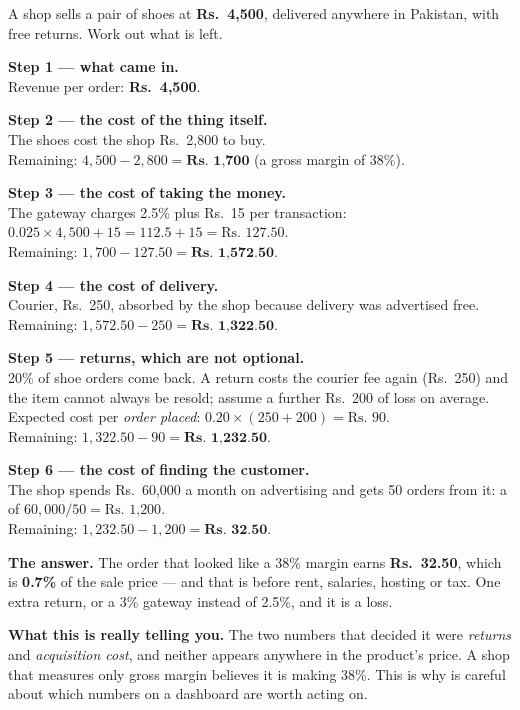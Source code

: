 \begin{worked}
A shop sells a pair of shoes at \textbf{Rs.~4{,}500}, delivered anywhere in
Pakistan, with free returns. Work out what is left.

\smallskip
\textbf{Step 1 --- what came in.}\\
Revenue per order: \textbf{Rs.~4{,}500}.

\smallskip
\textbf{Step 2 --- the cost of the thing itself.}\\
The shoes cost the shop Rs.~2{,}800 to buy.\\
Remaining: $4{,}500 - 2{,}800 = \textbf{Rs.~1{,}700}$ (a gross margin of 38\%).

\smallskip
\textbf{Step 3 --- the cost of taking the money.}\\
The gateway charges 2.5\% plus Rs.~15 per transaction:
$0.025 \times 4{,}500 + 15 = 112.5 + 15 = \text{Rs.~127.50}$.\\
Remaining: $1{,}700 - 127.50 = \textbf{Rs.~1{,}572.50}$.

\smallskip
\textbf{Step 4 --- the cost of delivery.}\\
Courier, Rs.~250, absorbed by the shop because delivery was advertised free.\\
Remaining: $1{,}572.50 - 250 = \textbf{Rs.~1{,}322.50}$.

\smallskip
\textbf{Step 5 --- returns, which are not optional.}\\
20\% of shoe orders come back. A return costs the courier fee again (Rs.~250)
and the item cannot always be resold; assume a further Rs.~200 of loss on
average. Expected cost per \emph{order placed}:
$0.20 \times (250 + 200) = \text{Rs.~90}$.\\
Remaining: $1{,}322.50 - 90 = \textbf{Rs.~1{,}232.50}$.

\smallskip
\textbf{Step 6 --- the cost of finding the customer.}\\
The shop spends Rs.~60{,}000 a month on advertising and gets 50 orders from it:
a  of $60{,}000 / 50 = \text{Rs.~1{,}200}$.\\
Remaining: $1{,}232.50 - 1{,}200 = \textbf{Rs.~32.50}$.

\smallskip
\textbf{The answer.} The order that looked like a 38\% margin earns
\textbf{Rs.~32.50}, which is \textbf{0.7\%} of the sale price --- and that is
before rent, salaries, hosting or tax. One extra return, or a 3\% gateway
instead of 2.5\%, and it is a loss.

\smallskip
\textbf{What this is really telling you.} The two numbers that decided it were
\emph{returns} and \emph{acquisition cost}, and neither appears anywhere in the
product's price. A shop that measures only gross margin believes it is making
38\%. This is why  is careful about which numbers on a
dashboard are worth acting on.
\end{worked}

